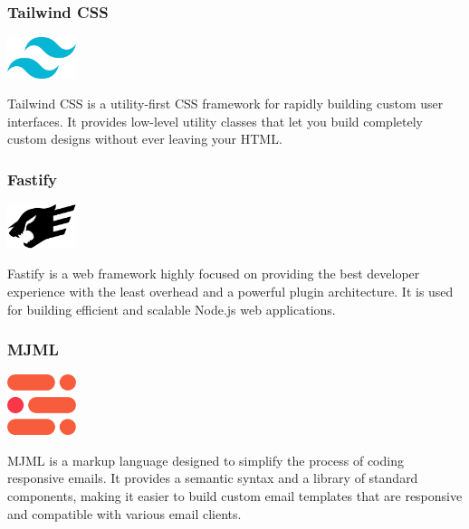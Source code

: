 \clearpage


\subsubsection*{Tailwind CSS}

\begin{center}
\includegraphics[width=0.15\textwidth]{Images/logos/tailwind.png}
\label{fig:tailwind}
\end{center}
Tailwind CSS is a utility-first CSS framework for rapidly building custom user interfaces. It provides low-level utility classes that let you build completely custom designs without ever leaving your HTML.

\subsubsection*{Fastify}

\begin{center}
\includegraphics[width=0.15\textwidth]{Images/logos/fastify.png}
\label{fig:fastify}
\end{center}
Fastify is a web framework highly focused on providing the best developer experience with the least overhead and a powerful plugin architecture. It is used for building efficient and scalable Node.js web applications.


\subsubsection*{MJML}

\begin{center}
\includegraphics[width=0.15\textwidth]{Images/logos/file-type-mjml.512x453.png}
\label{fig:MJML}
\end{center}
MJML is a markup language designed to simplify the process of coding responsive emails. It provides a semantic syntax and a library of standard components, making it easier to build custom email templates that are responsive and compatible with various email clients.


